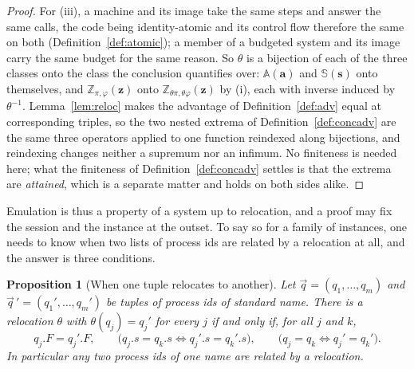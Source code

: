 \documentclass[11pt,a4paper]{article}
\newcommand{\bd}[1]{\mathbf{#1}}
\newcommand{\Aset}{\mathbb{A}}
\newcommand{\SimSet}{\mathbb{S}}
\newcommand{\ZenvSet}{\mathbb{Z}}
\theoremstyle{accentdef}
\theoremstyle{accentplain}
\newtheorem{proposition}[definition]{Proposition}
\begin{document}
\begin{proof}
For (iii), a machine and its image take the same steps and answer the same calls, the code being
identity-atomic and its control flow therefore the same on both
(Definition~\ref{def:atomic}); a member of a budgeted system and its image carry the same budget for
the same reason. So $\theta$ is a bijection of each of the three classes onto the class the
conclusion quantifies over: $\Aset(\bd{a})$ and $\SimSet(\bd{s})$ onto themselves, and
$\ZenvSet_{\pi,\varphi}(\bd{z})$ onto $\ZenvSet_{\theta\pi,\theta\varphi}(\bd{z})$ by (i), each with
inverse induced by $\theta^{-1}$. Lemma~\ref{lem:reloc} makes the advantage of
Definition~\ref{def:adv} equal at corresponding triples, so the two nested extrema of
Definition~\ref{def:concadv} are the same three operators applied to one function reindexed along
bijections, and reindexing changes neither a supremum nor an infimum. No finiteness is needed here;
what the finiteness of Definition~\ref{def:concadv} settles is that the extrema are \emph{attained},
which is a separate matter and holds on both sides alike.
\end{proof}

Emulation is thus a property of a system up to relocation, and a proof may fix the session and the
instance at the outset. To say so for a family of instances, one needs to know when two lists of
process ids are related by a relocation at all, and the answer is three conditions.

\begin{proposition}[When one tuple relocates to another]\label{prop:orbit}
Let $\vec q = (q_1,\ldots,q_m)$ and $\vec q\,' = (q_1',\ldots,q_m')$ be tuples of process ids of
standard name. There is a relocation $\theta$ with $\theta(q_j) = q_j'$ for every $j$ if and only if,
for all $j$ and $k$,
\[
  q_j.F = q_j'.F, \qquad
  \bigl(q_j.s = q_k.s \iff q_j'.s = q_k'.s\bigr), \qquad
  \bigl(q_j = q_k \iff q_j' = q_k'\bigr) .
\]
In particular any two process ids of one name are related by a relocation.
\end{proposition}
\end{document}
